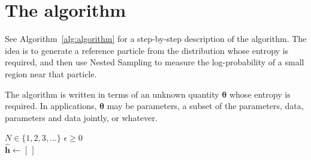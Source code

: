 \documentclass[entropy,article,accept,oneauthor,pdftex,10pt,a4paper]{mdpi}
\newcommand{\x}{\boldsymbol{\theta}}
\begin{document}
\section{The algorithm}

See Algorithm~\ref{alg:algorithm} for a step-by-step description of the
algorithm. The idea is to generate a reference particle from the distribution
whose entropy is required, and then use Nested Sampling to measure the
log-probability of a small region near that particle.

The algorithm is written in terms of an unknown quantity $\x$ whose entropy is required. In applications, $\x$ may be parameters,
a subset of the parameters, data, parameters and data jointly, or
whatever.

\begin{algorithm}
\begin{algorithmic}
\State $N \in \{1, 2, 3, ... \}$
\State $\epsilon \geq 0$
             \\
\hrulefill
\State $\widehat{\mathbf{h}} \leftarrow [\,]$


\end{algorithmic}
\end{algorithm}
\end{document}
